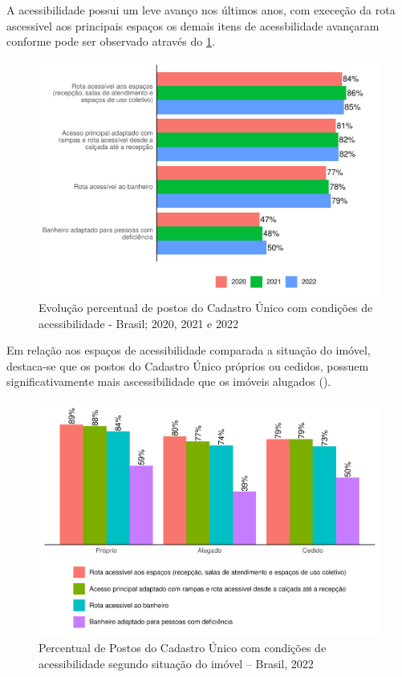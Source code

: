 \documentclass[
  brazilian]{report}
\begin{document}
A acessibilidade possui um leve avanço nos últimos anos, com execeção da
rota ascessivel aos principais espaços os demais itens de acessbilidade
avançaram conforme pode ser observado através do
\cref{fig:postcad-acessibilidade}.

\begin{figure}
\includegraphics{Censo-SUAS-2022_files/figure-latex/postcad-acessibilidade-1} \caption[Evolução percentual de postos do Cadastro Único com condições de acessibilidade - Brasil]{Evolução percentual de postos do Cadastro Único com condições de acessibilidade - Brasil; 2020, 2021 e 2022}\label{fig:postcad-acessibilidade}
\end{figure}

Em relação aos espaços de acessibilidade comparada a situação do imóvel,
destaca-se que os postos do Cadastro Único próprios ou cedidos, possuem
significativamente mais ascessibilidade que os imóveis alugados
().

\begin{figure}
\includegraphics{Censo-SUAS-2022_files/figure-latex/postcad-acessibilidade-situacao-1} \caption[Percentual de Postos do Cadastro Único com condições de acessibilidade segundo situação do imóvel – Brasil, 2022]{Percentual de Postos do Cadastro Único com condições de acessibilidade segundo situação do imóvel – Brasil, 2022}\label{fig:postcad-acessibilidade-situacao}
\end{figure}
\end{document}
